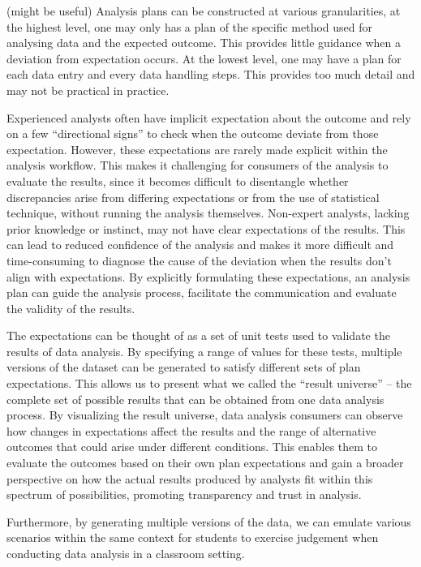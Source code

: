\documentclass[
]{jds}
\begin{document}
(might be useful) Analysis plans can be constructed at various
granularities, at the highest level, one may only has a plan of the
specific method used for analysing data and the expected outcome. This
provides little guidance when a deviation from expectation occurs. At
the lowest level, one may have a plan for each data entry and every data
handling steps. This provides too much detail and may not be practical
in practice.

Experienced analysts often have implicit expectation about the outcome
and rely on a few ``directional signs'' to check when the outcome
deviate from those expectation. However, these expectations are rarely
made explicit within the analysis workflow. This makes it challenging
for consumers of the analysis to evaluate the results, since it becomes
difficult to disentangle whether discrepancies arise from differing
expectations or from the use of statistical technique, without running
the analysis themselves. Non-expert analysts, lacking prior knowledge or
instinct, may not have clear expectations of the results. This can lead
to reduced confidence of the analysis and makes it more difficult and
time-consuming to diagnose the cause of the deviation when the results
don't align with expectations. By explicitly formulating these
expectations, an analysis plan can guide the analysis process,
facilitate the communication and evaluate the validity of the results.

The expectations can be thought of as a set of unit tests used to
validate the results of data analysis. By specifying a range of values
for these tests, multiple versions of the dataset can be generated to
satisfy different sets of plan expectations. This allows us to present
what we called the ``result universe'' -- the complete set of possible
results that can be obtained from one data analysis process. By
visualizing the result universe, data analysis consumers can observe how
changes in expectations affect the results and the range of alternative
outcomes that could arise under different conditions. This enables them
to evaluate the outcomes based on their own plan expectations and gain a
broader perspective on how the actual results produced by analysts fit
within this spectrum of possibilities, promoting transparency and trust
in analysis.

Furthermore, by generating multiple versions of the data, we can emulate
various scenarios within the same context for students to exercise
judgement when conducting data analysis in a classroom setting.
\end{document}
